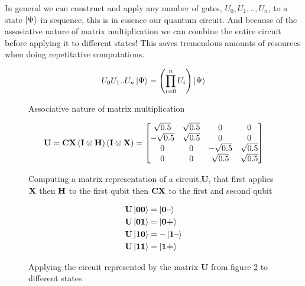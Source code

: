 \vspace{\baselineskip}
\noindent
In general we can construct and apply any number of gates, $U_0,U_1,..,U_n$, to a state $\ket{\Psi}$ in sequence, this is in essence our quantum circuit. 
And because of the assosiative nature of matrix multiplication we can combine the entire circuit before applying it to different states! 
This saves tremendous amounts of resources when doing repetitative computations.
\begin{figure}[H]
    \centering
    \begin{gather*}
        U_0 U_1 .. U_n \ket{\Psi} = \left(\prod_{i=0}^n U_i\right) \ket{\Psi}\\
    \end{gather*}
    \caption{Associative nature of matrix multiplication}
    \label{fig:assosiative}
\end{figure}

\begin{figure}[H]
    \centering
    \begin{align*}
        \mathbf{U}=\mathbf{CX}  \left(\mathbf{I}\otimes\mathbf{H}\right) \left(\mathbf{I}\otimes\mathbf{X}\right)        =
        \begin{bmatrix}
            \sqrt{0.5}  &  \sqrt{0.5} & 0 & 0 \\
            -\sqrt{0.5} &  \sqrt{0.5} & 0 & 0 \\
            0 & 0 & -\sqrt{0.5} & \sqrt{0.5} \\
            0 & 0 & \sqrt{0.5}  & \sqrt{0.5} \\
        \end{bmatrix}
    \end{align*}
    \caption{Computing a matrix representation of a circuit,$\mathbf{U}$, that first applies $\mathbf{X}$ then $\mathbf{H}$ to the first qubit then $\mathbf{CX}$ to the first and second qubit}
    \label{fig:circuit_matrix}
\end{figure}
\begin{figure}[H]
    \begin{align*}
        \mathbf{U}\ket{\mathbf{0}\mathbf{0}}&=\ket{\mathbf{0}\textbf{--}}\\
        \mathbf{U}\ket{\mathbf{0}\mathbf{1}}&=\ket{\mathbf{0}\textbf{+}}\\
        \mathbf{U}\ket{\mathbf{1}\mathbf{0}}&=-\ket{\mathbf{1}\textbf{--}}\\
        \mathbf{U}\ket{\mathbf{1}\mathbf{1}}&=\ket{\mathbf{1}\textbf{+}}
    \end{align*}
    \caption{Applying the circuit represented by the matrix $\mathbf{U}$ from figure \ref{fig:circuit_matrix} to different states}
    \label{fig:applying_circuit}
\end{figure}


